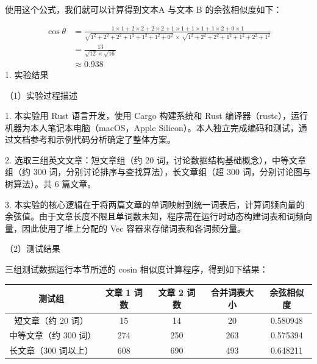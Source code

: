 \noindent\hspace*{2em}使用这个公式，我们就可以计算得到文本A 与文本 B 的余弦相似度如下：\par
\begin{equation*}
\begin{aligned}
\cos\theta &= \frac{1\times 1+2\times 2+2\times 2+1\times 1+1\times 1+1\times 2+0\times 1}{\sqrt{1^{2}+2^{2}+2^{2}+1^{2}+1^{2}+1^{2}+0^{2}}\,\times\,\sqrt{1^{2}+2^{2}+2^{2}+1^{2}+1^{2}+2^{2}+1^{2}}} \\
&= \frac{13}{\sqrt{12}\times\sqrt{16}} \\
&\approx 0.938
\end{aligned}
\end{equation*}
\noindent\hspace*{2em}1. 实验结果\par
\noindent\hspace*{2em}（1）实验过程描述\par
\noindent\hspace*{2em}1. 本实验用 Rust 语言开发，使用 Cargo 构建系统和 Rust 编译器（rustc），运行机器为本人笔记本电脑（macOS，Apple Silicon）。本人独立完成编码和测试，通过文档参考和示例代码分析确定了整体方案。\par
\noindent\hspace*{2em}2. 选取三组英文文章：短文章组（约 20 词，讨论数据结构基础概念），中等文章组（约 300 词，分别讨论排序与查找算法），长文章组（超 300 词，分别讨论图与树算法）。共 6 篇文章。\par
\noindent\hspace*{2em}3. 本实验的核心逻辑在于将两篇文章的单词映射到统一词表后，计算词频向量的余弦值。由于文章长度不限且单词数未知，程序需在运行时动态构建词表和词频向量，因此使用了堆上分配的 Vec 容器来存储词表和各词频分量。\par
\noindent\hspace*{2em}（2）测试结果\par
\noindent\hspace*{2em}三组测试数据运行本节所述的 cosin 相似度计算程序，得到如下结果：\par
\begin{center}
\fontsize{9pt}{12pt}\selectfont
\renewcommand{\arraystretch}{1.25}
\begin{tabular}{|c|c|c|c|c|}
\hline
测试组 & 文章 1 词数 & 文章 2 词数 & 合并词表大小 & 余弦相似度 \\ \hline
短文章（约 20 词）  & 15 & 14 & 20 & 0.580948 \\ \hline
中等文章（约 300 词）& 274 & 250 & 263 & 0.575394 \\ \hline
长文章（300 词以上）& 608 & 690 & 493 & 0.648211 \\ \hline
\end{tabular}
\end{center}

